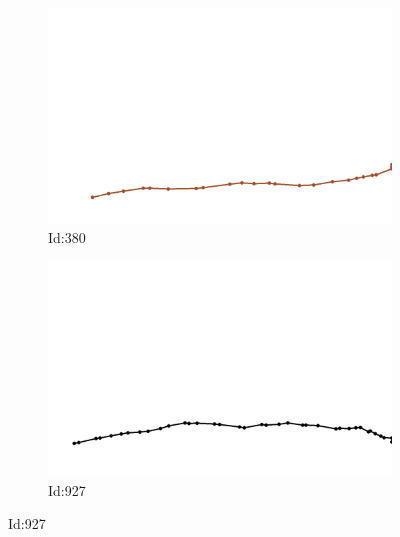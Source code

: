 \documentclass[12pt,twoside]{report}
\begin{document}
\begin{figure}
\centering
\begin{subfigure}[b]{0.20\textwidth}
\centering
\includegraphics[width=\textwidth]{../../trajectories/380.png}
\caption{Id:380}
\end{subfigure}
\begin{subfigure}[b]{0.20\textwidth}
\centering
\includegraphics[width=\textwidth]{../../trajectories/927.png}
\caption{Id:927}
\end{subfigure}
\end{figure}
\end{document}
